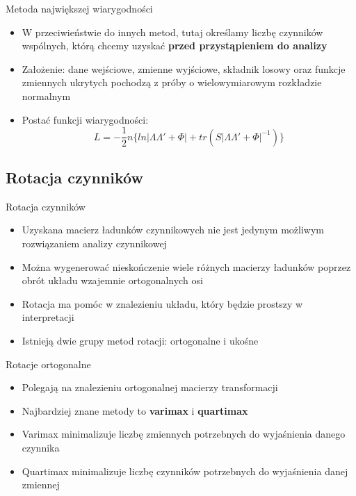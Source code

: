 \documentclass{beamer}
\begin{document}
\begin{frame}{Metoda największej wiarygodności}
  \begin{itemize}
  \item W przeciwieństwie do innych metod, tutaj określamy liczbę czynników wspólnych, którą chcemy uzyskać \textbf{przed przystąpieniem do analizy}
  \item Założenie: dane wejściowe, zmienne wyjściowe, składnik losowy oraz funkcje zmiennych ukrytych pochodzą z próby o wielowymiarowym rozkładzie normalnym
  \item Postać funkcji wiarygodności:
    $$L = -\frac{1}{2}n \{ln|\Lambda\Lambda' + \Phi| + tr(S|\Lambda\Lambda' + \Phi|^{-1})\} $$
   \end{itemize}
\end{frame}

\subsection{Rotacja czynników}

\begin{frame}{Rotacja czynników}
  \begin{itemize}
  \item Uzyskana macierz ładunków czynnikowych nie jest jedynym możliwym rozwiązaniem analizy czynnikowej
  \item Można wygenerować nieskończenie wiele różnych macierzy ładunków poprzez obrót układu wzajemnie ortogonalnych osi
  \item Rotacja ma pomóc w znalezieniu układu, który będzie prostszy w interpretacji
  \item Istnieją dwie grupy metod rotacji: ortogonalne i ukośne
   \end{itemize}
\end{frame}

\begin{frame}{Rotacje ortogonalne}
  \begin{itemize}
  \item Polegają na znalezieniu ortogonalnej macierzy transformacji
  \item Najbardziej znane metody to \textbf{varimax} i \textbf{quartimax}
  \item Varimax minimalizuje liczbę zmiennych potrzebnych do wyjaśnienia danego czynnika
  \item Quartimax minimalizuje liczbę czynników potrzebnych do wyjaśnienia danej zmiennej
   \end{itemize}
\end{frame}
\end{document}
